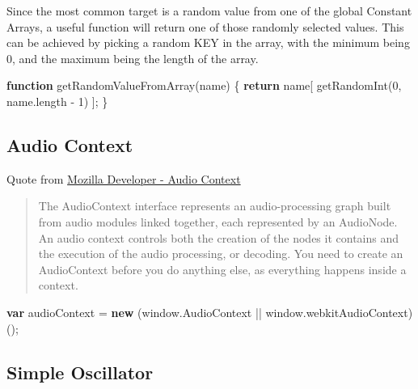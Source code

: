 \documentclass[]{article}
\newenvironment{Shaded}{}{}
\newcommand{\KeywordTok}[1]{\textcolor[rgb]{0.00,0.44,0.13}{\textbf{#1}}}
\newcommand{\DecValTok}[1]{\textcolor[rgb]{0.25,0.63,0.44}{#1}}
\newcommand{\VariableTok}[1]{\textcolor[rgb]{0.10,0.09,0.49}{#1}}
\newcommand{\ControlFlowTok}[1]{\textcolor[rgb]{0.00,0.44,0.13}{\textbf{#1}}}
\newcommand{\OperatorTok}[1]{\textcolor[rgb]{0.40,0.40,0.40}{#1}}
\newcommand{\AttributeTok}[1]{\textcolor[rgb]{0.49,0.56,0.16}{#1}}
\newcommand{\NormalTok}[1]{#1}
\begin{document}
Since the most common target is a random value from one of the global
Constant Arrays, a useful function will return one of those randomly
selected values. This can be achieved by picking a random KEY in the
array, with the minimum being 0, and the maximum being the length of the
array.

\begin{Shaded}
\begin{Highlighting}[]
\KeywordTok{function} \AttributeTok{getRandomValueFromArray}\NormalTok{(name) }\OperatorTok{\{}
    \ControlFlowTok{return}\NormalTok{ name[ }\AttributeTok{getRandomInt}\NormalTok{(}\DecValTok{0}\OperatorTok{,} \VariableTok{name}\NormalTok{.}\AttributeTok{length} \OperatorTok{-} \DecValTok{1}\NormalTok{) ]}\OperatorTok{;}
\OperatorTok{\}}
\end{Highlighting}
\end{Shaded}

\subsection{Audio Context}\label{audio-context}

Quote from
\href{https://developer.mozilla.org/en-US/docs/Web/API/AudioContext}{Mozilla
Developer - Audio Context}

\begin{quote}
The AudioContext interface represents an audio-processing graph built
from audio modules linked together, each represented by an AudioNode. An
audio context controls both the creation of the nodes it contains and
the execution of the audio processing, or decoding. You need to create
an AudioContext before you do anything else, as everything happens
inside a context.
\end{quote}

\begin{Shaded}
\begin{Highlighting}[]
\KeywordTok{var}\NormalTok{ audioContext }\OperatorTok{=} \KeywordTok{new}\NormalTok{ (}\VariableTok{window}\NormalTok{.}\AttributeTok{AudioContext} \OperatorTok{||} \VariableTok{window}\NormalTok{.}\AttributeTok{webkitAudioContext}\NormalTok{)()}\OperatorTok{;}
\end{Highlighting}
\end{Shaded}

\subsection{Simple Oscillator}\label{simple-oscillator}
\end{document}
